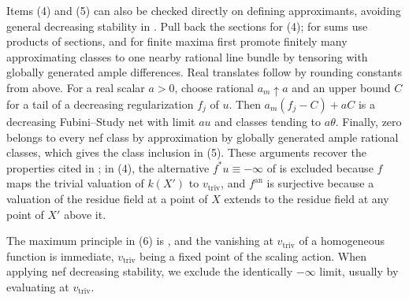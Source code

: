 \documentclass[11pt,a4paper]{article}
\newcommand{\an}{\mathrm{an}}          %
\newcommand{\vtriv}{v_{\mathrm{triv}}} %
\begin{document}
Items (4) and (5) can also be checked directly on defining approximants, avoiding general decreasing stability in \cite[Theorem~4.7]{BJ22}. Pull back the sections for (4); for sums use products of sections, and for finite maxima first promote finitely many approximating classes to one nearby rational line bundle by tensoring with globally generated ample differences. Real translates follow by rounding constants from above. For a real scalar $a>0$, choose rational $a_m\uparrow a$ and an upper bound $C$ for a tail of a decreasing regularization $f_j$ of $u$. Then $a_m(f_j-C)+aC$ is a decreasing Fubini--Study net with limit $au$ and classes tending to $a\theta$. Finally, zero belongs to every nef class by approximation by globally generated ample rational classes, which gives the class inclusion in (5). These arguments recover the properties cited in \cite[Theorem~4.7 and Equation~(4.3)]{BJ22}; in (4), the alternative $f^*u\equiv-\infty$ of \cite[Theorem~4.7(iii)]{BJ22} is excluded because $f$ maps the trivial valuation of $k(X')$ to $\vtriv$, and $f^{\an}$ is surjective because a valuation of the residue field at a point of $X$ extends to the residue field at any point of $X'$ above it.

The maximum principle in (6) is \cite[Proposition~4.12]{BJ22}, and the vanishing at $\vtriv$ of a homogeneous function is immediate, $\vtriv$ being a fixed point of the scaling action. When applying nef decreasing stability, we exclude the identically $-\infty$ limit, usually by evaluating at $\vtriv$.
\end{document}
